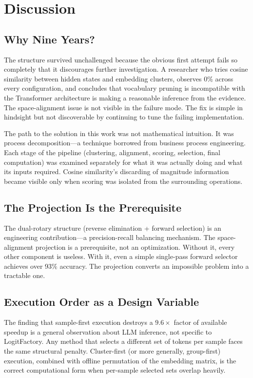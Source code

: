 \documentclass[11pt]{article}
\begin{document}
\section{Discussion}

\subsection{Why Nine Years?}

The structure survived unchallenged because the obvious first attempt fails so completely that it discourages further investigation. A researcher who tries cosine similarity between hidden states and embedding clusters, observes 0\% across every configuration, and concludes that vocabulary pruning is incompatible with the Transformer architecture is making a reasonable inference from the evidence. The space-alignment issue is not visible in the failure mode. The fix is simple in hindsight but not discoverable by continuing to tune the failing implementation.

The path to the solution in this work was not mathematical intuition. It was process decomposition---a technique borrowed from business process engineering. Each stage of the pipeline (clustering, alignment, scoring, selection, final computation) was examined separately for what it was actually doing and what its inputs required. Cosine similarity's discarding of magnitude information became visible only when scoring was isolated from the surrounding operations.

\subsection{The Projection Is the Prerequisite}

The dual-rotary structure (reverse elimination + forward selection) is an engineering contribution---a precision-recall balancing mechanism. The space-alignment projection is a prerequisite, not an optimization. Without it, every other component is useless. With it, even a simple single-pass forward selector achieves over 93\% accuracy. The projection converts an impossible problem into a tractable one.

\subsection{Execution Order as a Design Variable}

The finding that sample-first execution destroys a $9.6\times$ factor of available speedup is a general observation about LLM inference, not specific to LogitFactory. Any method that selects a different set of tokens per sample faces the same structural penalty. Cluster-first (or more generally, group-first) execution, combined with offline permutation of the embedding matrix, is the correct computational form when per-sample selected sets overlap heavily.
\end{document}
